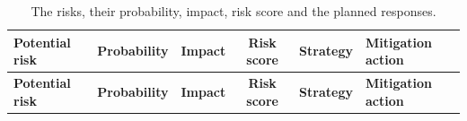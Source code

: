\begin{longtable}{|p{}|c|c|c|c|p{}|}
    \caption{The risks, their probability, impact, risk score and the planned responses.} \label{tab:risk_response} \\
    \hline
    \textbf{Potential risk} & \textbf{Probability} & \textbf{Impact} & \textbf{Risk score} & \textbf{Strategy} & \textbf{Mitigation action} \\ \hline
    \endfirsthead

    \hline
    \textbf{Potential risk} & \textbf{Probability} & \textbf{Impact} & \textbf{Risk score} & \textbf{Strategy} & \textbf{Mitigation action} \\ \hline
    \endhead
    

\end{longtable}
